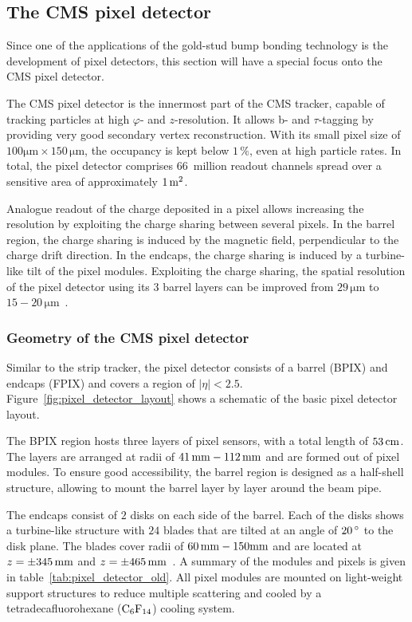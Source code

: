 \subsection{The \ac{CMS} pixel detector}\label{sec:CMS_pixel}
Since one of the applications of the gold-stud bump bonding technology is the development of pixel detectors, this section will have a special focus onto the \ac{CMS} pixel detector.

The \ac{CMS} pixel detector is the innermost part of the \ac{CMS} tracker, capable of tracking particles at high $\varphi$- and $z$-resolution. It allows b- and $\tau$-tagging by providing very good secondary vertex reconstruction. With its small pixel size of $100\si{\micro \meter}\times 150\,\si{\micro \meter}$, the occupancy is kept below $1\,\%$, even at high particle rates. In total, the pixel detector comprises $66$~million readout channels spread over a sensitive area of approximately $1\,\rm{m^2}$.

Analogue readout of the charge deposited in a pixel allows increasing the resolution by exploiting the charge sharing between several pixels. In the barrel region, the charge sharing is induced by the magnetic field, perpendicular to the charge drift direction. In the endcaps, the charge sharing is induced by a turbine-like tilt of the pixel modules. Exploiting the charge sharing, the spatial resolution of the pixel detector using its 3 barrel layers can be improved from $29\,\si{\micro \meter}$ to $15-20\,\si{\micro \meter}$~\cite{Erd09}.



\subsubsection{Geometry of the \ac{CMS} pixel detector}
Similar to the strip tracker, the pixel detector consists of a barrel (\acs{BPIX}) and endcaps (\acs{FPIX}) and covers a region of $|\eta |<2.5$. Figure~\ref{fig:pixel_detector_layout} shows a schematic of the basic pixel detector layout.

The \acs{BPIX} region hosts three layers of pixel sensors, with a total length of $53\,\rm{cm}$. The layers are arranged at radii of $41\,\rm{mm}-112\,\rm{mm}$ and are formed out of pixel modules. To ensure good accessibility, the barrel region is designed as a half-shell structure, allowing to mount the barrel layer by layer around the beam pipe.

The endcaps consist of $2$ disks on each side of the barrel. Each of the disks shows a turbine-like structure with $24$ blades that are tilted at an angle of $20\,^{\rm{\circ}}$ to the disk plane. The blades cover radii of $60\,\rm{mm}-150\rm{mm}$ and are located at $z=\pm 345\,\rm{mm}$ and $z=\pm 465\,\rm{mm}$~\cite{Erd09}. A summary of the modules and pixels is given in table~\ref{tab:pixel_detector_old}. All pixel modules are mounted on light-weight support structures to reduce multiple scattering and cooled by a tetradecafluorohexane ($\rm{C_6F_{14}}$) cooling system.



